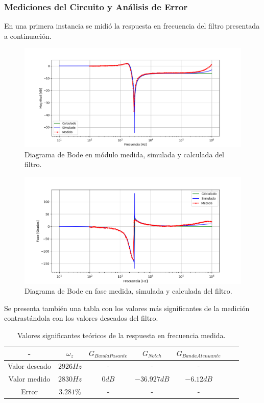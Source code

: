 \subsubsection{Mediciones del Circuito y Análisis de Error}
\label{sec:mediciones}

En una primera instancia se midió la respuesta en frecuencia del filtro presentada a continuación.

\begin{figure}[H]
	\centering
	\includegraphics[width=\textwidth]{Imagenes/bode_calc_sim_med.PNG}
	\caption{Diagrama de Bode en módulo medida, simulada y calculada del filtro.}
	\label{fig:bode_calc_sim_med}
\end{figure}

\begin{figure}[H]
	\centering
	\includegraphics[width=\textwidth]{Imagenes/bodefase_calc_sim_med.PNG}
	\caption{Diagrama de Bode en fase medida, simulada y calculada del filtro.}
	\label{fig:bodefase_calc_sim_med}
\end{figure}

Se presenta también una tabla con los valores más significantes de la medición contrastándola con los valores deseados del filtro.

\begin{table}[H]
\centering
\begin{tabular}{@{}ccccccc@{}}
\toprule
- & $\omega_z$ & $G_{Banda Pasante}$  & $G_{Notch}$ & $G_{Banda Atenuante}$ \\ \midrule
Valor deseado & $2926Hz$ & - & - & - \\
Valor medido & $2830Hz$ & $0dB$ & $-36.927dB$ & $-6.12dB$ \\
Error & $3.281\%$ & - & - & - \\ \bottomrule
\end{tabular}
\caption{Valores significantes teóricos de la respuesta en frecuencia medida.}
\label{tab:rta_freq_calc}
\end{table}

